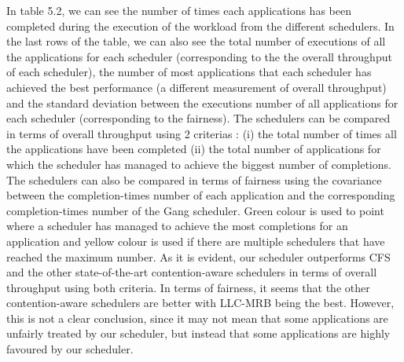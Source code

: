 \documentclass[diploma]{Styles/softlab-thesis}
\begin{document}
In table 5.2, we can see the number of times each applications has been completed during the execution of the workload from the different schedulers. In the last rows of the table, we can also see the total number of executions of all the applications for each scheduler (corresponding to the the overall throughput of each scheduler), the number of most applications that each scheduler has achieved the best performance (a different measurement of overall throughput) and the standard deviation between the executions number of all applications for each scheduler (corresponding to the fairness). The schedulers can be compared in terms of overall throughput using 2 criterias : (i) the total number of times all the applications have been completed (ii) the total number of applications for which the scheduler has managed to achieve the biggest number of completions. The schedulers can also be compared in terms of fairness using the covariance between the completion-times number of each application and the corresponding completion-times number of the Gang scheduler. Green colour is used to point where a scheduler has managed to achieve the most completions for an application and yellow colour is used if there are multiple schedulers that have reached the maximum number. As it is evident, our scheduler outperforms CFS and the other state-of-the-art contention-aware schedulers in terms of overall throughput using both criteria. In terms of fairness, it seems that the other contention-aware schedulers are better with LLC-MRB being the best. However, this is not a clear conclusion, since it may not mean that some applications are unfairly treated by our scheduler, but instead that some applications are highly favoured by our scheduler. \\
\end{document}
